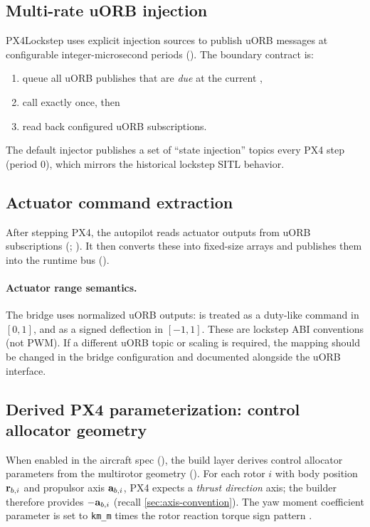 \subsection{Multi-rate uORB injection}

PX4Lockstep uses explicit injection sources to publish uORB messages at configurable integer-microsecond periods (). The boundary contract is:
\begin{enumerate}[leftmargin=*,itemsep=2pt]
  \item queue all uORB publishes that are \emph{due} at the current ,
  \item call  exactly once, then
  \item read back configured uORB subscriptions.
\end{enumerate}
The default injector publishes a set of ``state injection'' topics every PX4 step (period $0$), which mirrors the historical lockstep SITL behavior.

\subsection{Actuator command extraction}

After stepping PX4, the autopilot reads actuator outputs from uORB subscriptions (; ). It then converts these into fixed-size  arrays and publishes them into the runtime bus ().

\paragraph{Actuator range semantics.}
The bridge uses normalized uORB outputs:  is treated as a duty-like command in \([0,1]\), and  as a signed deflection in \([-1,1]\). These are lockstep ABI conventions (not PWM). If a different uORB topic or scaling is required, the mapping should be changed in the bridge configuration and documented alongside the uORB interface.

\subsection{Derived PX4 parameterization: control allocator geometry}

When enabled in the aircraft spec (), the build layer derives  control allocator parameters from the multirotor geometry (). For each rotor $i$ with body position $\mathbf{r}_{b,i}$ and propulsor axis $\mathbf{a}_{b,i}$, PX4 expects a \emph{thrust direction} axis; the builder therefore provides $-\mathbf{a}_{b,i}$ (recall \cref{sec:axis-convention}). The yaw moment coefficient parameter  is set to \texttt{km\_m} times the rotor reaction torque sign pattern .

